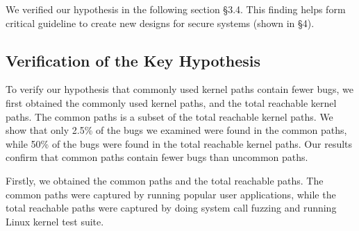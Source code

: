 We verified our hypothesis in the following section \S{3.4}. This finding helps form critical guideline to 
create new designs for secure systems (shown in \S{4}). 

\subsection{Verification of the Key Hypothesis}

To verify our hypothesis that commonly used kernel paths contain fewer bugs, we first 
obtained the commonly used kernel paths, and the total reachable kernel paths. The common paths 
is a subset of the total reachable kernel paths. We show that only 2.5\% of the bugs we examined were 
found in the common paths, while 50\% of the bugs were found in the total reachable kernel paths. 
Our results confirm that common paths contain fewer bugs than uncommon paths.

Firstly, we obtained the common paths and the total reachable paths. 
The common paths were captured by running popular user applications, while the total reachable paths 
were captured by doing system call fuzzing and running Linux kernel test suite. 


